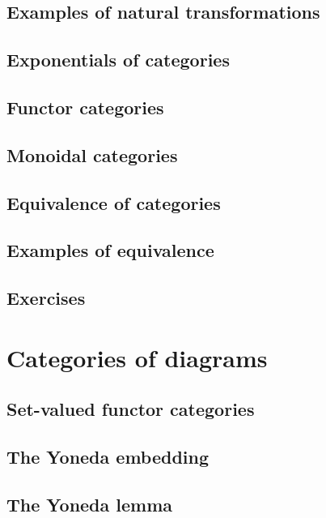 \documentclass[uplatex, 12pt, dvipdfmx]{jsarticle}
\begin{document}
\subsection{Examples of natural transformations}

\subsection{Exponentials of categories}

\subsection{Functor categories}

\subsection{Monoidal categories}

\subsection{Equivalence of categories}

\subsection{Examples of equivalence}

\subsection{Exercises}

\section{Categories of diagrams}

\subsection{Set-valued functor categories}

\subsection{The Yoneda embedding}

\subsection{The Yoneda lemma}
\end{document}
